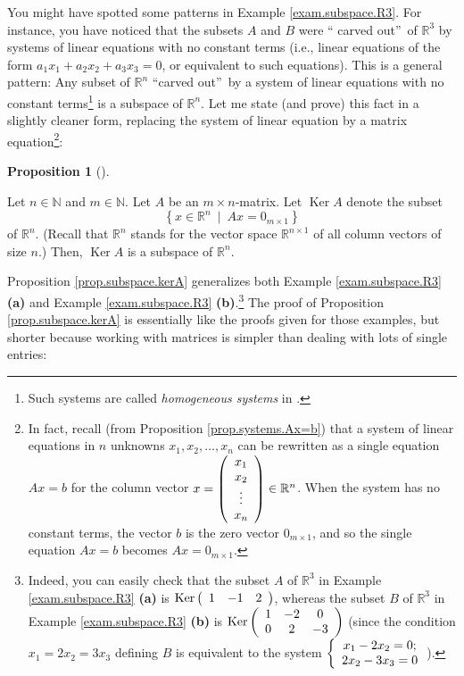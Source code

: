 \documentclass[numbers=enddot,12pt,final,onecolumn,notitlepage]{scrartcl}%
\theoremstyle{definition}
\newtheorem{prop}[theo]{Proposition}
\newenvironment{proposition}[1][]
{\begin{prop}[#1]\begin{leftbar}}
{\end{leftbar}\end{prop}}
\begin{document}
You might have spotted some patterns in Example \ref{exam.subspace.R3}. For
instance, you have noticed that the subsets $A$ and $B$ were \textquotedblleft
carved out\textquotedblright\ of $\mathbb{R}^{3}$ by systems of linear
equations with no constant terms (i.e., linear equations of the form
$a_{1}x_{1}+a_{2}x_{2}+a_{3}x_{3}=0$, or equivalent to such equations). This
is a general pattern: Any subset of $\mathbb{R}^{n}$ \textquotedblleft carved
out\textquotedblright\ by a system of linear equations with no constant
terms\footnote{Such systems are called \textit{homogeneous systems} in
\cite[\S 1.8]{OlvSha06}.} is a subspace of $\mathbb{R}^{n}$. Let me state (and
prove) this fact in a slightly cleaner form, replacing the system of linear
equation by a matrix equation\footnote{In fact, recall (from Proposition
\ref{prop.systems.Ax=b}) that a system of linear equations in $n$ unknowns
$x_{1},x_{2},\ldots,x_{n}$ can be rewritten as a single equation $Ax=b$ for
the column vector $x=\left(
\begin{array}
[c]{c}%
x_{1}\\
x_{2}\\
\vdots\\
x_{n}%
\end{array}
\right)  \in\mathbb{R}^{n}$. When the system has no constant terms, the vector
$b$ is the zero vector $0_{m\times1}$, and so the single equation $Ax=b$
becomes $Ax=0_{m\times1}$.}:

\begin{proposition}
\label{prop.subspace.kerA}Let $n\in\mathbb{N}$ and $m\in\mathbb{N}$. Let $A$
be an $m\times n$-matrix. Let $\operatorname*{Ker}A$ denote the subset%
\[
\left\{  x\in\mathbb{R}^{n}\ \mid\ Ax=0_{m\times1}\right\}
\]
of $\mathbb{R}^{n}$. (Recall that $\mathbb{R}^{n}$ stands for the vector space
$\mathbb{R}^{n\times1}$ of all column vectors of size $n$.) Then,
$\operatorname*{Ker}A$ is a subspace of $\mathbb{R}^{n}$.
\end{proposition}

Proposition \ref{prop.subspace.kerA} generalizes both Example
\ref{exam.subspace.R3} \textbf{(a)} and Example \ref{exam.subspace.R3}
\textbf{(b)}.\footnote{Indeed, you can easily check that the subset $A$ of
$\mathbb{R}^{3}$ in Example \ref{exam.subspace.R3} \textbf{(a)} is
$\operatorname*{Ker}\left(
\begin{array}
[c]{ccc}%
1 & -1 & 2
\end{array}
\right)  $, whereas the subset $B$ of $\mathbb{R}^{3}$ in Example
\ref{exam.subspace.R3} \textbf{(b)} is $\operatorname*{Ker}\left(
\begin{array}
[c]{ccc}%
1 & -2 & 0\\
0 & 2 & -3
\end{array}
\right)  $ (since the condition $x_{1}=2x_{2}=3x_{3}$ defining $B$ is
equivalent to the system $\left\{
\begin{array}
[c]{c}%
x_{1}-2x_{2}=0;\\
2x_{2}-3x_{3}=0
\end{array}
\right.  $).} The proof of Proposition \ref{prop.subspace.kerA} is essentially
like the proofs given for those examples, but shorter because working with
matrices is simpler than dealing with lots of single entries:
\end{document}
